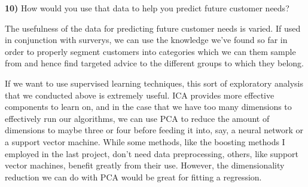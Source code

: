 \documentclass{article}
\begin{document}
    \textbf{10)} How would you use that data to help you predict future
customer needs?

    The usefulness of the data for predicting future customer needs is
varied. If used in conjunction with surverys, we can use the knowledge
we've found so far in order to properly segment customers into
categories which we can them sample from and hence find targeted advice
to the different groups to which they belong.

If we want to use supervised learning techniques, this sort of
exploratory analysis that we conducted above is extremely useful. ICA
provides more effective components to learn on, and in the case that we
have too many dimensions to effectively run our algorithms, we can use
PCA to reduce the amount of dimensions to maybe three or four before
feeding it into, say, a neural network or a support vector machine.
While some methods, like the boosting methods I employed in the last
project, don't need data preprocessing, others, like support vector
machines, benefit greatly from their use. However, the dimensionality
reduction we can do with PCA would be great for fitting a regression.


    
    
    
    
\end{document}
